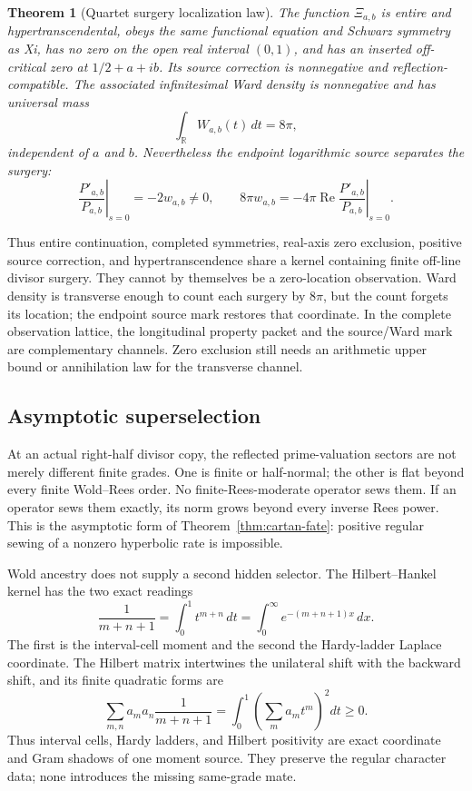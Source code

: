 \documentclass[11pt]{article}
\newtheorem{theorem}{Theorem}[section]
\theoremstyle{definition}
\theoremstyle{remark}
\newcommand{\Rea}{\operatorname{Re}}
\begin{document}
\begin{theorem}[Quartet surgery localization law]
\label{thm:quartet-surgery}
The function \(\Xi_{a,b}\) is entire and hypertranscendental, obeys the
same functional equation and Schwarz symmetry as Xi, has no zero on the
open real interval \((0,1)\), and has an inserted off-critical zero at
\(1/2+a+ib\).  Its source correction is nonnegative and
reflection-compatible.  The associated infinitesimal Ward density is
nonnegative and has universal mass
\[
                     \int_{\mathbb R}W_{a,b}(t)\,dt=8\pi,
\tag{4.18}\label{eq:quartet-eight-pi}
\]
independent of \(a\) and \(b\).  Nevertheless the endpoint logarithmic
source separates the surgery:
\[
 \left.\frac{P'_{a,b}}{P_{a,b}}\right|_{s=0}
       =-2w_{a,b}\ne0,\qquad
 8\pi w_{a,b}
       =-4\pi\Rea\left.\frac{P'_{a,b}}{P_{a,b}}\right|_{s=0}.
\tag{4.19}\label{eq:quartet-source-mark}
\]
\end{theorem}

Thus entire continuation, completed symmetries, real-axis zero exclusion,
positive source correction, and hypertranscendence share a kernel containing
finite off-line divisor surgery.  They cannot by themselves be a
zero-location observation.  Ward density is transverse enough to count each
surgery by \(8\pi\), but the count forgets its location; the endpoint source
mark restores that coordinate.  In the complete observation lattice, the
longitudinal property packet and the source/Ward mark are complementary
channels.  Zero exclusion still needs an arithmetic upper bound or
annihilation law for the transverse channel.

\subsection{Asymptotic superselection}

At an actual right-half divisor copy, the reflected prime-valuation
sectors are not merely different finite grades.  One is finite or
half-normal; the other is flat beyond every finite Wold--Rees order.
No finite-Rees-moderate operator sews them.  If an operator sews them
exactly, its norm grows beyond every inverse Rees power.  This is the
asymptotic form of Theorem~\ref{thm:cartan-fate}: positive regular sewing of a
nonzero hyperbolic rate is impossible.

Wold ancestry does not supply a second hidden selector.  The
Hilbert--Hankel kernel has the two exact readings
\[
 \frac1{m+n+1}
 =\int_0^1t^{m+n}\,dt
 =\int_0^\infty e^{-(m+n+1)x}\,dx .
\tag{4.20}\label{eq:hilbert-hankel-two-moments}
\]
The first is the interval-cell moment and the second the Hardy-ladder
Laplace coordinate.  The Hilbert matrix intertwines the unilateral shift
with the backward shift, and its finite quadratic forms are
\[
 \sum_{m,n}a_ma_n\frac1{m+n+1}
 =\int_0^1\left(\sum_ma_mt^m\right)^2dt\ge0.
\tag{4.21}\label{eq:hilbert-hankel-positive-moment}
\]
Thus interval cells, Hardy ladders, and Hilbert positivity are exact
coordinate and Gram shadows of one moment source.  They preserve the
regular character data; none introduces the missing same-grade mate.
\end{document}
